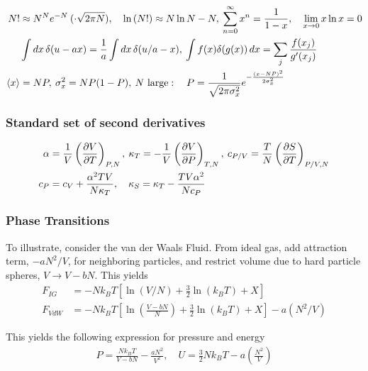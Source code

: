 \documentclass[a4paper, english, 12pt]{article}
\newcommand{\closed}[1]{\left( #1 \right)}
\newcommand{\bracket}[1]{\left[ #1 \right]}
\begin{document}
\tiny
\begin{multicols*}{2}


\subsubsection*{}
\begin{align*}
  N! & \approx N^N e^{-N}\:(\cdot \sqrt{2\pi N}),\quad  \ln{(N!)}  \approx N\ln{N}-N,\:\sum_{n=0}^\infty x^n = \frac{1}{1-x},\quad \lim_{x\to0} x\ln x = 0 \\
  &\int dx\,\delta(u-ax) = \frac{1}{a}\int dx\,\delta(u/a - x),\:\int f(x)\delta(g(x))\,dx = \sum_j \frac{f(x_j)}{g'(x_j)} \\
  \expval{x}&=NP,\: \sigma_x^2=NP(1-P),\:N\text{ large}:\quad P = \frac{1}{\sqrt{2\pi \sigma_x^2}} e^{-\frac{(x-NP)^2}{2\sigma_x^2}}
\end{align*}

\subsubsection*{\scriptsize Standard set of second derivatives}
\begin{align*}
    \alpha &= \frac{1}{V}\left(\pdv{V}{T} \right)_{P,N},\: \kappa_T = -\frac{1}{V}\left(\pdv{V}{P} \right)_{T,N},\: c_{P/V} = \frac{T}{N}\left(\pdv{S}{T} \right)_{P/V,N} \\
    c_P &= c_V + \frac{\alpha^2 TV}{N\kappa_T},\quad \kappa_S = \kappa_T - \frac{TV \alpha^2}{Nc_P}
\end{align*}


\subsubsection*{\scriptsize Phase Transitions}
To illustrate, consider the van der Waals Fluid. From ideal gas, add attraction term, $-a N^2/V$, for neighboring particles, and restrict volume due to hard particle spheres, $V\to V-bN$. This yields 
\begin{align*}
    F_{IG} &= -N k_B T \bracket{\ln(V/N) + \frac{3}{2}\ln(k_B T)+X} \\ 
    F_{VdW} &= - N k_B T \bracket{\ln\closed{\frac{V-bN}{N}} + \frac{3}{2}\ln(k_B T)+X} - a(N^2/V)
\end{align*}

This yields the following expression for pressure and energy 
\begin{align*}
    P = \frac{Nk_B T}{V - bN} - \frac{a N^2}{V^2},\quad U = \frac{3}{2}N k_B T - a \closed{\frac{N^2}{V}}
\end{align*}



\end{multicols*}
\end{document}
